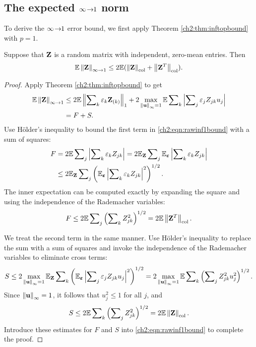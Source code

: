 \subsection{The expected $\infty\!\rightarrow\!\!1$ norm}
To derive the $\infty\!\rightarrow\!\!1$ error bound, we first apply Theorem
\ref{ch2:thm:inftopbound} with $p=1$.

\begin{thm}
Suppose that $\mathbf{Z}$ is a random matrix with independent, zero-mean entries.
Then 
\[
\mathbb{E}\left\|\mathbf{Z}\right\|_{\infty\rightarrow 1}\leq2\mathbb{E}(\left\|\mathbf{Z}\right\|_{\mathrm{col}}+\left\|\mathbf{Z}^{T}\right\|_{\mathrm{col}}).
\]
\label{ch2:thm:inf1errbound}
\end{thm}

\begin{proof}
Apply Theorem \ref{ch2:thm:inftopbound} to get 
\begin{equation}
\begin{aligned}
\mathbb{E}\left\|\mathbf{Z}\right\|_{\infty\rightarrow1} &
\leq2\mathbb{E}\left\|\sum\nolimits_{k}\varepsilon_{k}\mathbf{Z}_{(k)}\right\|_{1}
+2\max_{\left\|\mathbf{u}\right\|_\infty = 1}\mathbb{E}\sum\nolimits_{k}\left|\sum\nolimits_{j}\varepsilon_{j}Z_{jk}
u_{j}\right| \\
 & = F + S.
\end{aligned}
\label{ch2:eqn:rawinf1bound}
\end{equation}
Use H\"older's inequality to bound the first term in \eqref{ch2:eqn:rawinf1bound}
with a sum of squares:
\begin{align*}
F &
=2\mathbb{E}\sum\nolimits_{j}\left|\sum\nolimits_{k}\varepsilon_{k}Z_{jk}\right|=2\mathbb{E}_{
\mathbf{Z}}\sum\nolimits_{j}\mathbb{E}_{\boldsymbol{\varepsilon}}\left|\sum\nolimits_{k}
\varepsilon_{k}Z_{jk}\right|\\
 &
\leq2\mathbb{E}_{\mathbf{Z}}\sum\nolimits_{j}\left(\mathbb{E}_{\boldsymbol{\varepsilon}}
\left|\sum\nolimits_{k}\varepsilon_{k}Z_{jk}\right|^{2}\right)^{1/2}.
\end{align*}
The inner expectation can be computed exactly by expanding the square and using
the independence of the Rademacher variables:
\[
F \leq
2\mathbb{E}\sum\nolimits_{j}\left(\sum\nolimits_{k}Z_{jk}^{2}\right)^{1/2}=2\mathbb{E}\left\|
\mathbf{Z}^{T}\right\|_{\mathrm{col}}.
\]

We treat the second term in the same manner. Use H\"older's inequality to
replace the sum with a sum of squares and invoke the independence of the
Rademacher variables to eliminate cross terms:
\[
S
\leq2\max_{\left\|\mathbf{u}\right\|_\infty = 1}\mathbb{E}_{\mathbf{Z}}\sum\nolimits_{k}\left(\mathbb{E}_{\boldsymbol{
\varepsilon}}\left|\sum\nolimits_{j}\varepsilon_{j}Z_{jk}u_{j}\right|^{2}
\right)^{1/2}
 =
2\max_{\left\|\mathbf{u}\right\|_\infty = 1}\mathbb{E}\sum\nolimits_{k}\left(\sum\nolimits_{j}Z_{jk}^{2}u_{j}^{2}
\right)^{1/2}.
\]
Since $\left\|\mathbf{u}\right\|_\infty=1$, it follows that $u_{j}^{2}\leq1$ for all $j$, and 
\[
S
\leq2\mathbb{E}\sum\nolimits_{k}\left(\sum\nolimits_{j}Z_{jk}^{2}\right)^{1/2}
=2\mathbb{E}\left\|\mathbf{Z}\right\|_{\mathrm{col}}.
\]
Introduce these estimates for $F$ and $S$ into \eqref{ch2:eqn:rawinf1bound} to
complete the proof.
\end{proof}

